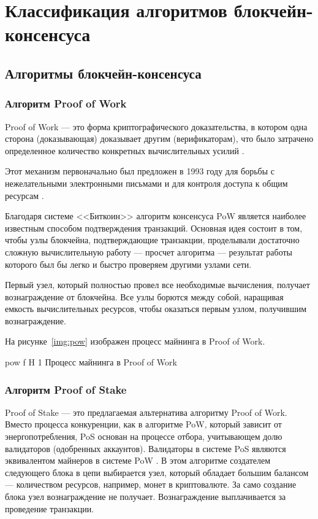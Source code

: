 \chapter{Классификация алгоритмов блокчейн-консенсуса}

\section{Алгоритмы блокчейн-консенсуса}

\subsection{Алгоритм Proof of Work}

Proof of Work --- это форма криптографического доказательства, в котором одна сторона (доказывающая) доказывает другим (верификаторам), что было затрачено определенное количество конкретных вычислительных усилий \cite{Lachtar2020}.

Этот механизм первоначально был предложен в 1993 году для борьбы с нежелательными электронными письмами и для контроля доступа к общим ресурсам \cite{Dwork1982}.

Благодаря системе <<Биткоин>> алгоритм консенсуса PoW является наиболее известным способом подтверждения транзакций. 
Основная идея состоит в том, чтобы узлы блокчейна, подтверждающие транзакции, проделывали достаточно сложную вычислительную работу --- просчет алгоритма --- результат работы которого был бы легко и быстро проверяем другими узлами сети.

Первый узел, который полностью провел все необходимые вычисления, получает вознаграждение от блокчейна. 
Все узлы борются между собой, наращивая емкость вычислительных ресурсов, чтобы оказаться первым узлом, получившим вознаграждение.

На рисунке~\ref{img:pow} изображен процесс майнинга в Proof of Work.

    {pow}
    {f}
    {H}
    {1\textwidth}
    {Процесс майнинга в Proof of Work \cite{Auhl2022}}

\subsection{Алгоритм Proof of Stake}

Proof of Stake --- это предлагаемая альтернатива алгоритму Proof of Work. 
Вместо процесса конкуренции, как в алгоритме PoW, который зависит от энергопотребления, PoS основан на процессе отбора, учитывающем долю валидаторов (одобренных аккаунтов). 
Валидаторы в системе PoS являются эквивалентом майнеров в системе PoW \cite[361]{Azbeg2020}.
В этом алгоритме создателем следующего блока в цепи выбирается узел, который обладает большим балансом --- количеством ресурсов, например, монет в криптовалюте. 
За само создание блока узел вознаграждение не получает. 
Вознаграждение выплачивается за проведение транзакции.

